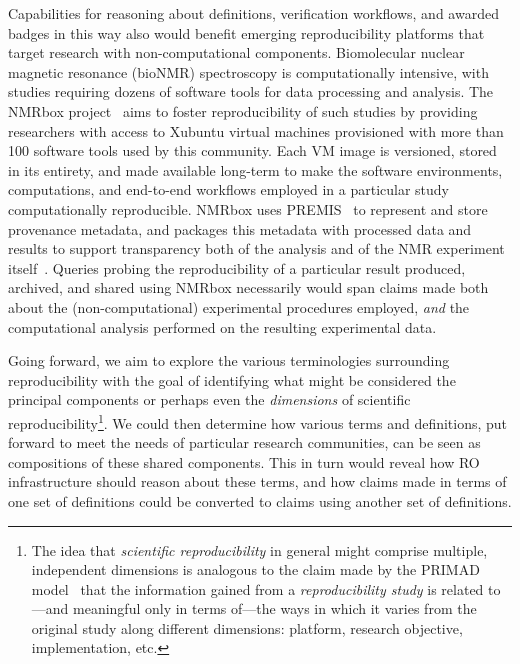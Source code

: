 Capabilities for reasoning about definitions, verification workflows, and awarded
    badges in this way also would benefit emerging reproducibility platforms that
    target research with non-computational components.
Biomolecular nuclear magnetic resonance (bioNMR) spectroscopy is
    computationally intensive, with studies requiring dozens of software tools for data
    processing and analysis.
The NMRbox project~\cite{maciejewski_nmrbox:_2017} aims to foster reproducibility of such studies
    by providing researchers with access to
    Xubuntu virtual machines provisioned with more than 100 software tools used by this community.
Each VM image is versioned, stored in its entirety, and made
    available long-term to make the software environments, computations, and end-to-end workflows
    employed in a particular study computationally reproducible.
NMRbox uses PREMIS~\cite{premis2019} to represent and store provenance metadata,
    and packages this metadata with
    processed data and results to support transparency both of the analysis and of the NMR
    experiment itself~\cite{heintz_curating_2019}.
Queries probing the reproducibility of a particular result produced, archived, and shared
    using NMRbox necessarily would span claims made both about the (non-computational)
    experimental procedures employed, \emph{and} the computational analysis performed on
    the resulting experimental data.

Going forward, we aim to explore the various terminologies surrounding
    reproducibility with the goal of identifying what might be considered the
     principal components or perhaps even the \emph{dimensions} of scientific reproducibility\footnote{
        The idea that \emph{scientific reproducibility} in general might comprise multiple,
            independent dimensions
            is analogous to the claim made by the PRIMAD
            model~\cite{rauber16primad} that the information gained
            from a \emph{reproducibility study} is related to---and meaningful only in terms
            of---the ways in which it varies from the original study along
            different dimensions: platform, research objective, implementation, etc.
    }.
We could then determine how various terms and definitions,
    put forward to meet the needs of particular research communities,
    can be seen as compositions of these shared components.
This in turn would reveal how RO infrastructure should reason about these terms,
	and how claims made in terms of one set of definitions could be converted to
    claims using another set of definitions.

